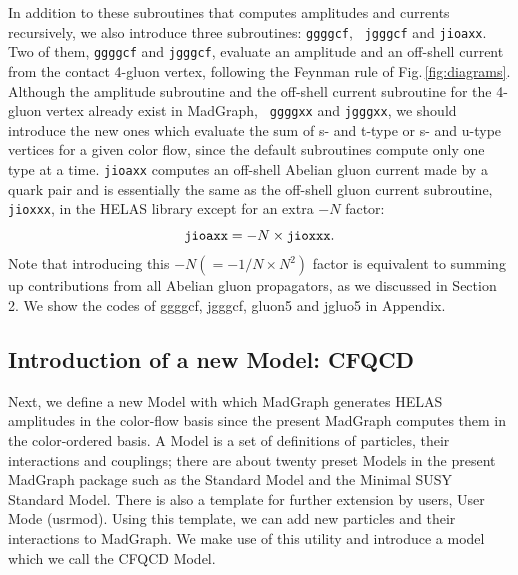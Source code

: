 \documentclass[a4paper,11pt]{article}
\begin{document}
In addition to these subroutines that computes amplitudes and currents
recursively, we also introduce three subroutines: {\tt ggggcf}, {\tt
jgggcf} and {\tt jioaxx}. Two of them, {\tt ggggcf} and {\tt jgggcf}, evaluate  an
amplitude and an off-shell current from the contact 4-gluon vertex,
following the Feynman rule of Fig.\,\ref{fig:diagrams}. Although
 the amplitude subroutine and the off-shell current subroutine for the 4-gluon vertex already exist in MadGraph, {\tt
ggggxx} and {\tt jgggxx}, we should introduce
the new ones which evaluate the sum of s- and t-type or s- and u-type
vertices
 for a given color flow, since the
default subroutines compute only one type at a time. {\tt jioaxx}
computes an off-shell Abelian gluon current made by a quark pair and is
essentially the same as the off-shell gluon current
 subroutine, {\tt jioxxx}, in the HELAS library\cite{HELAS} except for an extra $-N$ factor:
 \begin{equation}
  {\tt jioaxx} = -N \times {\tt jioxxx}.
\end{equation}
Note that introducing this $-N(=-1/N \times N^2)$ factor is equivalent to summing up
contributions from all  Abelian gluon propagators, as we discussed in Section 2. We show the codes
of ggggcf, jgggcf, gluon5 and jgluo5 in Appendix.

\subsection{Introduction of a new Model: CFQCD}
Next, we define a new Model with which MadGraph generates HELAS
amplitudes in the color-flow basis since the present MadGraph computes them in the color-ordered basis\cite{multiparton}.
 A Model is a
set of definitions of particles,
their interactions and couplings; there are about twenty preset Models in
the present MadGraph package\cite{MG/ME} such as the Standard Model and the
Minimal SUSY Standard Model\cite{MSSM}. There is also a
template for further extension by users, User Mode (usrmod). Using this template, we can add new particles and their
interactions to MadGraph. We make use of this utility and introduce a
model which we call the CFQCD Model.
\end{document}
